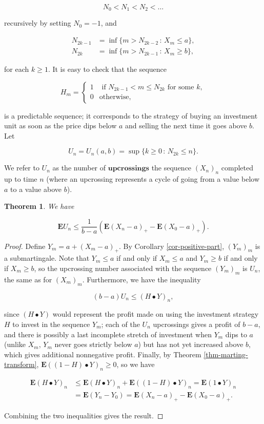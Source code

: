 \documentclass[11pt]{report}
\theoremstyle{plain}
\newtheorem{thm}{Theorem}[chapter]
\theoremstyle{definition}
\begin{document}
\[
N_0 < N_1 < N_2 < \ldots
\]

recursively by setting $N_0=-1$, and

\begin{align*}
N_{2k-1} &= \inf \{ m > N_{2k-2}\,:\,X_m\le a\}, \\
N_{2k} &= \inf \{ m > N_{2k-1}\,:\,X_m\ge b\},
\end{align*}

for each $k\ge 1$. It is easy to check that the sequence

\[
H_m = \begin{cases} 1 &\textrm{ if }N_{2k-1}<m\le N_{2k}\textrm{ for some }k, \\
0 & \textrm{otherwise},
\end{cases}
\]

is a predictable sequence; it corresponds to the strategy of buying an investment unit as soon as the price dips below $a$ and selling the next time it goes above $b$. Let

\[
U_n = U_n(a,b) = \sup \{ k\ge 0\,:\,N_{2k}\le n\}.
\]

We refer to $U_n$ as the number of $\textbf{upcrossings}$ the sequence $(X_n)_n$ completed up to time $n$ (where an upcrossing represents a cycle of going from a value below $a$ to a value above $b$).

\begin{thm}
We have

\[
\mathbf{E} U_n \le \frac{1}{b-a}\left( \mathbf{E}(X_n-a)_+ - \mathbf{E}(X_0-a)_+ \right).
\]

\end{thm}

\begin{proof}
Define $Y_m = a+(X_m-a)_+$. By Corollary \ref{cor-positive-part}, $(Y_m)_m$ is a submartingale. Note that $Y_m\le a$ if and only if $X_m\le a$ and $Y_m\ge b$ if and only if $X_m\ge b$, so the upcrossing number associated with the sequence $(Y_m)_m$ is $U_n$, the same as for $(X_m)_m$. Furthermore, we have the inequality

\[
(b-a)U_n \le (H\bullet Y)_n,
\]

since $(H\bullet Y)$ would represent the profit made on using the investment strategy $H$ to invest in the sequence $Y_m$; each of the $U_n$ upcrossings gives a profit of $b-a$, and there is possibly a last incomplete stretch of investment when $Y_m$ dips to $a$ (unlike $X_m$, $Y_m$ never goes strictly below $a$) but has not yet increased above $b$, which gives additional nonnegative profit. Finally, by Theorem \ref{thm-marting-transform}, $\mathbf{E}((1-H)\bullet Y)_n\ge 0$, so we have

\begin{align*}
\mathbf{E}(H\bullet Y)_n &\le \mathbf{E}(H\bullet Y)_n + \mathbf{E}((1-H)\bullet Y)_n = \mathbf{E}(1\bullet Y)_n \\ &= \mathbf{E}(Y_n-Y_0) = \mathbf{E}(X_n-a)_+ - \mathbf{E}(X_0-a)_+.
\end{align*}

Combining the two inequalities gives the result.
\end{proof}
\end{document}
